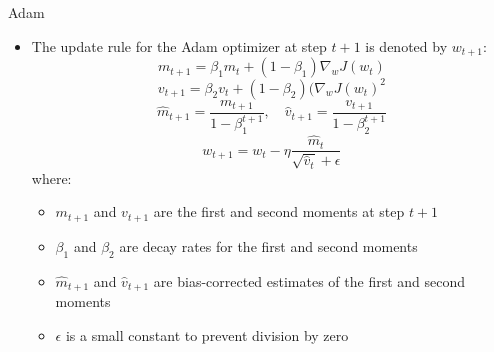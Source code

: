 \documentclass[serif, aspectratio=169]{beamer}
\begin{document}
\begin{frame}{Adam}
    \begin{itemize}
        \item The update rule for the Adam optimizer at step $t+1$ is denoted by $w_{t+1}$:
        \[m_{t+1} = \beta_1 m_t + (1 - \beta_1) \nabla_w J(w_t)\]
        \[v_{t+1} = \beta_2 v_t + (1 - \beta_2) (\nabla_w J(w_t)^2\]
        \[\hat{m}_{t+1} = \frac{m_{t+1}}{1 - \beta_1^{t+1}}, \quad 
        \hat{v}_{t+1} = \frac{v_{t+1}}{1 - \beta_2^{t+1}}\]
        \[w_{t+1} = w_t - \eta \frac{\hat{m}_t}{\sqrt{\hat{v}_t} + \epsilon}\]
        where:
        \begin{itemize}
            \item $m_{t+1}$ and $v_{t+1}$ are the first and second moments at step $t+1$
            \item $\beta_1$ and $\beta_2$ are decay rates for the first and second moments
            \item $\hat{m}_{t+1}$ and $\hat{v}_{t+1}$ are bias-corrected estimates of the first and second moments
            \item $\epsilon$ is a small constant to prevent division by zero
        \end{itemize}
    \end{itemize}

\end{frame}
\end{document}
